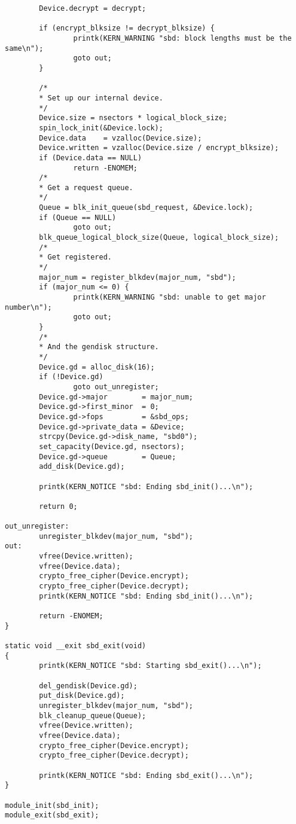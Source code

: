 \documentclass[letterpaper,10pt,titlepage,draftclsnofoot,onecolumn]{article}
\begin{document}
\begin{lstlisting}
        Device.decrypt = decrypt;

        if (encrypt_blksize != decrypt_blksize) {
                printk(KERN_WARNING "sbd: block lengths must be the same\n");
                goto out;
        }

        /*
        * Set up our internal device.
        */
        Device.size = nsectors * logical_block_size;
        spin_lock_init(&Device.lock);
        Device.data    = vzalloc(Device.size);
        Device.written = vzalloc(Device.size / encrypt_blksize);
        if (Device.data == NULL)
                return -ENOMEM;
        /*
        * Get a request queue.
        */
        Queue = blk_init_queue(sbd_request, &Device.lock);
        if (Queue == NULL)
                goto out;
        blk_queue_logical_block_size(Queue, logical_block_size);
        /*
        * Get registered.
        */
        major_num = register_blkdev(major_num, "sbd");
        if (major_num <= 0) {
                printk(KERN_WARNING "sbd: unable to get major number\n");
                goto out;
        }
        /*
        * And the gendisk structure.
        */
        Device.gd = alloc_disk(16);
        if (!Device.gd)
                goto out_unregister;
        Device.gd->major        = major_num;
        Device.gd->first_minor  = 0;
        Device.gd->fops         = &sbd_ops;
        Device.gd->private_data = &Device;
        strcpy(Device.gd->disk_name, "sbd0");
        set_capacity(Device.gd, nsectors);
        Device.gd->queue        = Queue;
        add_disk(Device.gd);

        printk(KERN_NOTICE "sbd: Ending sbd_init()...\n");

        return 0;

out_unregister:
        unregister_blkdev(major_num, "sbd");
out:
        vfree(Device.written);
        vfree(Device.data);
        crypto_free_cipher(Device.encrypt);
        crypto_free_cipher(Device.decrypt);
        printk(KERN_NOTICE "sbd: Ending sbd_init()...\n");

        return -ENOMEM;
}

static void __exit sbd_exit(void)
{
        printk(KERN_NOTICE "sbd: Starting sbd_exit()...\n");

        del_gendisk(Device.gd);
        put_disk(Device.gd);
        unregister_blkdev(major_num, "sbd");
        blk_cleanup_queue(Queue);
        vfree(Device.written);
        vfree(Device.data);
        crypto_free_cipher(Device.encrypt);
        crypto_free_cipher(Device.decrypt);

        printk(KERN_NOTICE "sbd: Ending sbd_exit()...\n");
}

module_init(sbd_init);
module_exit(sbd_exit);

\end{lstlisting}
\end{document}
